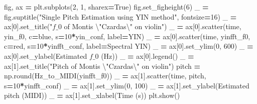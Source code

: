 \documentclass[
  american,
]{article}
\newenvironment{Shaded}{\begin{snugshade}}{\end{snugshade}}
\newcommand{\BuiltInTok}[1]{#1}
\newcommand{\CharTok}[1]{\textcolor[rgb]{0.31,0.60,0.02}{#1}}
\newcommand{\DecValTok}[1]{\textcolor[rgb]{0.00,0.00,0.81}{#1}}
\newcommand{\NormalTok}[1]{#1}
\newcommand{\OperatorTok}[1]{\textcolor[rgb]{0.81,0.36,0.00}{\textbf{#1}}}
\newcommand{\StringTok}[1]{\textcolor[rgb]{0.31,0.60,0.02}{#1}}
\newcommand{\VariableTok}[1]{\textcolor[rgb]{0.00,0.00,0.00}{#1}}
\begin{document}
\begin{Shaded}
\begin{Highlighting}[]
\NormalTok{fig, ax }\OperatorTok{=}\NormalTok{ plt.subplots(}\DecValTok{2}\NormalTok{, }\DecValTok{1}\NormalTok{, sharex}\OperatorTok{=}\VariableTok{True}\NormalTok{)}
\NormalTok{fig.set\_figheight(}\DecValTok{6}\NormalTok{)}
\NormalTok{\_ }\OperatorTok{=}\NormalTok{ fig.suptitle(}\StringTok{"Single Pitch Estimation using YIN method"}\NormalTok{, fontsize}\OperatorTok{=}\DecValTok{16}\NormalTok{)}
\NormalTok{\_ }\OperatorTok{=}\NormalTok{ ax[}\DecValTok{0}\NormalTok{].set\_title(}\StringTok{"$f\_0$ of Monti\textquotesingle{}s }\CharTok{\textbackslash{}"}\StringTok{Czardas}\CharTok{\textbackslash{}"}\StringTok{ on violin"}\NormalTok{)}
\NormalTok{\_ }\OperatorTok{=}\NormalTok{ ax[}\DecValTok{0}\NormalTok{].scatter(time, yin\_f0, c}\OperatorTok{=}\StringTok{\textquotesingle{}blue\textquotesingle{}}\NormalTok{, s}\OperatorTok{=}\DecValTok{10}\OperatorTok{*}\NormalTok{yin\_conf, label}\OperatorTok{=}\StringTok{\textquotesingle{}YIN\textquotesingle{}}\NormalTok{)}
\NormalTok{\_ }\OperatorTok{=}\NormalTok{ ax[}\DecValTok{0}\NormalTok{].scatter(time, yinfft\_f0, c}\OperatorTok{=}\StringTok{\textquotesingle{}red\textquotesingle{}}\NormalTok{, s}\OperatorTok{=}\DecValTok{10}\OperatorTok{*}\NormalTok{yinfft\_conf, label}\OperatorTok{=}\StringTok{\textquotesingle{}Spectral YIN\textquotesingle{}}\NormalTok{)}
\NormalTok{\_ }\OperatorTok{=}\NormalTok{ ax[}\DecValTok{0}\NormalTok{].set\_ylim(}\DecValTok{0}\NormalTok{, }\DecValTok{600}\NormalTok{)}
\NormalTok{\_ }\OperatorTok{=}\NormalTok{ ax[}\DecValTok{0}\NormalTok{].set\_ylabel(}\StringTok{\textquotesingle{}Estimated $f\_0$ (Hz)\textquotesingle{}}\NormalTok{)}
\NormalTok{\_ }\OperatorTok{=}\NormalTok{ ax[}\DecValTok{0}\NormalTok{].legend()}
\NormalTok{\_ }\OperatorTok{=}\NormalTok{ ax[}\DecValTok{1}\NormalTok{].set\_title(}\StringTok{"Pitch of Monti\textquotesingle{}s }\CharTok{\textbackslash{}"}\StringTok{Czardas}\CharTok{\textbackslash{}"}\StringTok{ on violin"}\NormalTok{)}
\NormalTok{pitch }\OperatorTok{=}\NormalTok{ np.}\BuiltInTok{round}\NormalTok{(Hz\_to\_MIDI(yinfft\_f0))}
\NormalTok{\_ }\OperatorTok{=}\NormalTok{ ax[}\DecValTok{1}\NormalTok{].scatter(time, pitch, s}\OperatorTok{=}\DecValTok{10}\OperatorTok{*}\NormalTok{yinfft\_conf)}
\NormalTok{\_ }\OperatorTok{=}\NormalTok{ ax[}\DecValTok{1}\NormalTok{].set\_ylim(}\DecValTok{0}\NormalTok{, }\DecValTok{100}\NormalTok{)}
\NormalTok{\_ }\OperatorTok{=}\NormalTok{ ax[}\DecValTok{1}\NormalTok{].set\_ylabel(}\StringTok{\textquotesingle{}Estimated pitch (MIDI)\textquotesingle{}}\NormalTok{)}
\NormalTok{\_ }\OperatorTok{=}\NormalTok{ ax[}\DecValTok{1}\NormalTok{].set\_xlabel(}\StringTok{\textquotesingle{}Time (s)\textquotesingle{}}\NormalTok{)}
\NormalTok{plt.show()}
\end{Highlighting}
\end{Shaded}
\end{document}
